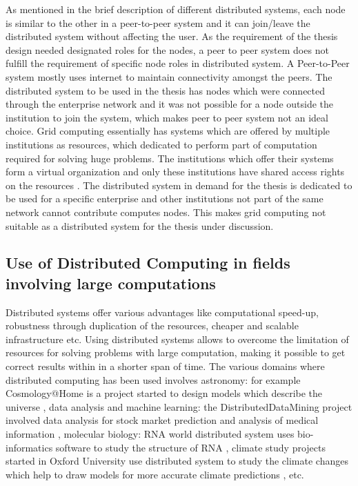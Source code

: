 \begin{itemize}
As mentioned in the brief description of different distributed systems, each node is similar to the other in a peer-to-peer system and it can join/leave the distributed system without affecting the user. As the requirement of the thesis design needed designated roles for the nodes, a peer to peer system does not fulfill the requirement of specific node roles in distributed system. A Peer-to-Peer system mostly uses internet to maintain connectivity amongst the peers. The distributed system to be used in the thesis has nodes which were connected through the enterprise network and it was not possible for a node outside the institution to join the system, which makes peer to peer system not an ideal choice. Grid computing essentially has systems which are offered by multiple institutions as resources, which dedicated to perform part of computation required for solving huge problems. The institutions which offer their systems form a virtual organization and only these institutions have shared access rights on the resources \cite{DSBook}. The distributed system in demand for the thesis is dedicated to be used for a specific enterprise and other institutions not part of the same network cannot contribute computes nodes. This makes grid computing not suitable as a distributed system for the thesis under discussion. 


\subsection{Use of Distributed Computing in fields involving large computations}

Distributed systems offer various advantages like computational speed-up, robustness through duplication of the resources, cheaper and scalable infrastructure etc. 
Using distributed systems allows to overcome the limitation of resources for solving problems with large computation, making it possible to get correct results within in a shorter span of time. The various domains where distributed computing has been used involves astronomy: for example Cosmology@Home is a project started to design models which describe the universe \cite{coshome}, data analysis and machine learning: the DistributedDataMining project involved data analysis for stock market prediction and analysis of medical information \cite{DisDataMin}, molecular biology: RNA world distributed system uses bio-informatics software to study the structure of RNA \cite{rnaworld}, climate study projects started in Oxford University use distributed system to study the climate changes which help to draw models for more accurate climate predictions \cite{ClimaProj}, etc. \newline


\end{itemize}
